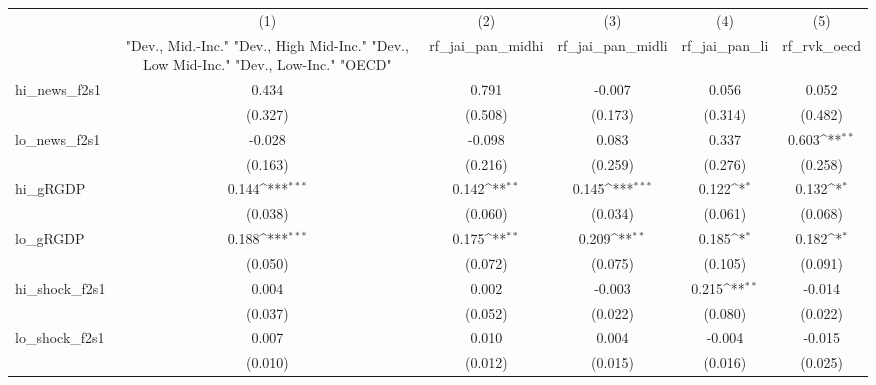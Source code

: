 {
\def\sym#1{\ifmmode^{#1}\else\(^{#1}\)\fi}
\begin{tabular}{l*{5}{c}}
\toprule
            &\multicolumn{1}{c}{(1)}&\multicolumn{1}{c}{(2)}&\multicolumn{1}{c}{(3)}&\multicolumn{1}{c}{(4)}&\multicolumn{1}{c}{(5)}\\
            &\multicolumn{1}{c}{ "Dev., Mid.-Inc." "Dev., High Mid-Inc." "Dev., Low Mid-Inc." "Dev., Low-Inc." "OECD" }&\multicolumn{1}{c}{rf\_jai\_pan\_midhi}&\multicolumn{1}{c}{rf\_jai\_pan\_midli}&\multicolumn{1}{c}{rf\_jai\_pan\_li}&\multicolumn{1}{c}{rf\_rvk\_oecd}\\
\midrule
hi\_news\_f2s1&       0.434         &       0.791         &      -0.007         &       0.056         &       0.052         \\
            &     (0.327)         &     (0.508)         &     (0.173)         &     (0.314)         &     (0.482)         \\
\addlinespace
lo\_news\_f2s1&      -0.028         &      -0.098         &       0.083         &       0.337         &       0.603\sym{**} \\
            &     (0.163)         &     (0.216)         &     (0.259)         &     (0.276)         &     (0.258)         \\
\addlinespace
hi\_gRGDP    &       0.144\sym{***}&       0.142\sym{**} &       0.145\sym{***}&       0.122\sym{*}  &       0.132\sym{*}  \\
            &     (0.038)         &     (0.060)         &     (0.034)         &     (0.061)         &     (0.068)         \\
\addlinespace
lo\_gRGDP    &       0.188\sym{***}&       0.175\sym{**} &       0.209\sym{**} &       0.185\sym{*}  &       0.182\sym{*}  \\
            &     (0.050)         &     (0.072)         &     (0.075)         &     (0.105)         &     (0.091)         \\
\addlinespace
hi\_shock\_f2s1&       0.004         &       0.002         &      -0.003         &       0.215\sym{**} &      -0.014         \\
            &     (0.037)         &     (0.052)         &     (0.022)         &     (0.080)         &     (0.022)         \\
\addlinespace
lo\_shock\_f2s1&       0.007         &       0.010         &       0.004         &      -0.004         &      -0.015         \\
            &     (0.010)         &     (0.012)         &     (0.015)         &     (0.016)         &     (0.025)         \\

\end{tabular}}
